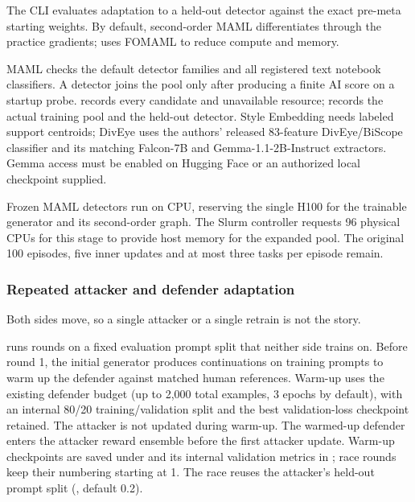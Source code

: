 The CLI evaluates adaptation to a held-out detector against the exact
pre-meta starting weights. By default, second-order MAML differentiates
through the practice gradients; \texttt{} uses
FOMAML to reduce compute and memory.

MAML checks the default detector families and all registered text
notebook classifiers. A detector joins the pool only after producing a
finite AI score on a startup probe.
\texttt{} records every candidate
and unavailable resource; \texttt{}
records the actual training pool and the held-out detector. Style
Embedding needs labeled support centroids; DivEye uses the authors'
released 83-feature DivEye/BiScope classifier and its matching Falcon-7B
and Gemma-1.1-2B-Instruct extractors. Gemma access must be enabled on
Hugging Face or an authorized local checkpoint supplied.

Frozen MAML detectors run on CPU, reserving the single H100 for the
trainable generator and its second-order graph. The Slurm controller
requests 96 physical CPUs for this stage to provide host memory for the
expanded pool. The original 100 episodes, five inner updates and at most
three tasks per episode remain.

\subsubsection{Repeated attacker and defender
adaptation}\label{record-docs-research-guide-md-repeated-attacker-and-defender-adaptation}

Both sides move, so a single attacker or a single retrain is not the
story.

\texttt{} runs
\texttt{} rounds on a fixed evaluation prompt
split that neither side trains on. Before round 1, the initial generator
produces continuations on training prompts to warm up the defender
against matched human references. Warm-up uses the existing defender
budget (up to 2,000 total examples, 3 epochs by default), with an
internal 80/20 training/validation split and the best validation-loss
checkpoint retained. The attacker is not updated during warm-up. The
warmed-up defender enters the attacker reward ensemble before the first
attacker update. Warm-up checkpoints are saved under
\texttt{} and its internal validation metrics
in \texttt{}; race rounds keep their
numbering starting at 1. The race reuses the attacker's held-out prompt
split (\texttt{},
default 0.2).

